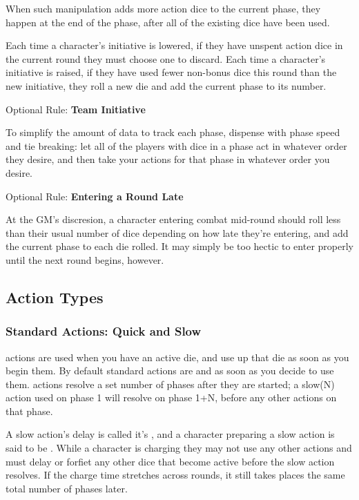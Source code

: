 \begin{multicols}{2}
         When such manipulation adds more action dice to the current phase, they happen at the end of the phase, after all of the existing dice have been used.

         Each time a character's initiative is lowered, if they have unspent action dice in the current round they must choose one to discard. Each time a character's initiative is raised, if they have used fewer non-bonus dice this round than the new initiative, they roll a new die and add the current phase to its number.

        \begin{boco}
            Optional Rule: \textbf{Team Initiative}\pc%

            To simplify the amount of data to track each phase, dispense with phase speed and tie breaking: let all of the players with dice in a phase act in whatever order they desire, and then take your actions for that phase in whatever order you desire.\pw%

             Optional Rule: \textbf{Entering a Round Late}\pc%

            At the GM's discresion, a character entering combat mid-round should roll less than their usual number of dice depending on how late they're entering, and add the current phase to each die rolled. It may simply be too hectic to enter properly until the next round begins, however.
        \end{boco}

    \subsection{Action Types}\label{subsec:actions}

        \subsubsection{Standard Actions: Quick and Slow}
             actions are used when you have an active die, and use up that die as soon as you begin them. By default standard actions are  and  as soon as you decide to use them.  actions resolve a set number of phases after they are started; a slow(N) action used on phase 1 will resolve on phase 1+N, before any other actions on that phase.
            
            A slow action's delay is called it's , and a character preparing a slow action is said to be . While a character is charging they may not use any other actions and must delay or forfiet any other dice that become active before the slow action resolves. If the charge time stretches across rounds, it still takes places the same total number of phases later.


\end{multicols}
